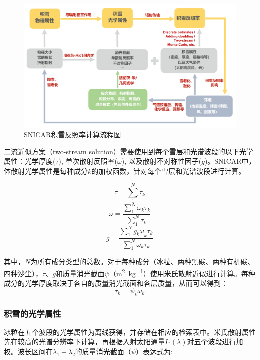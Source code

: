 {
  \begin{figure}[htbp]
    \centering
    \includegraphics[width=1\columnwidth]{Figures/辐射过程及辐射通量计算/SNICAR模型计算流程图_v2.png}
    \caption{SNICAR积雪反照率计算流程图\citep{he2020SnowAlbedoRadiative}}
    \label{fig:SNICAR模型流程图}
  \end{figure}
}

二流近似方案（two-stream
solution）需要使用到每个雪层和光谱波段的以下光学属性：光学厚度($\tau$),
单次散射反照率($\omega$),
以及散射不对称性因子($g$)。SNICAR中，体散射光学属性是每种成分$k$的加权函数，针对每个雪层和光谱波段进行计算。

\begin{equation}
  \tau = \sum_{1}^{N}\tau_{k}
\end{equation}
%
\begin{equation}
  \omega = \frac{\sum_{1}^{N}\omega_{k}\tau_{k}}{\sum_{1}^{N}\tau_{k}}
\end{equation}
%
\begin{equation}
  g = \frac{\sum_{1}^{N}{g_{k}\omega}_{k}\tau_{k}}{\sum_{1}^{N}\omega_{k}\tau_{k}}
\end{equation}

其中，$N$为所有成分类型的总数。对于每种成分（冰粒、两种黑碳、两种有机碳、四种沙尘），$\tau$、$g$和质量消光截面$\psi$（\unit{m^2.kg^{-1}}）使用米氏散射近似进行计算。每种成分的光学厚度取决于各自的质量消光截面和各层质量，从而可以得到：
\begin{equation}
  \tau_{k} = \psi_{k}\omega_{k}
\end{equation}

\subsubsection{积雪的光学属性}
冰粒在五个波段的光学属性为离线获得，并存储在相应的检索表中。米氏散射属性先在较高的光谱分辨率下计算，再根据入射太阳通量\(I^{\downarrow}(\lambda)\)对五个波段进行加权。波长区间在$\lambda_{1}-\lambda_{2}$的质量消光截面（\(\overline{\psi}\)）表达式为:

